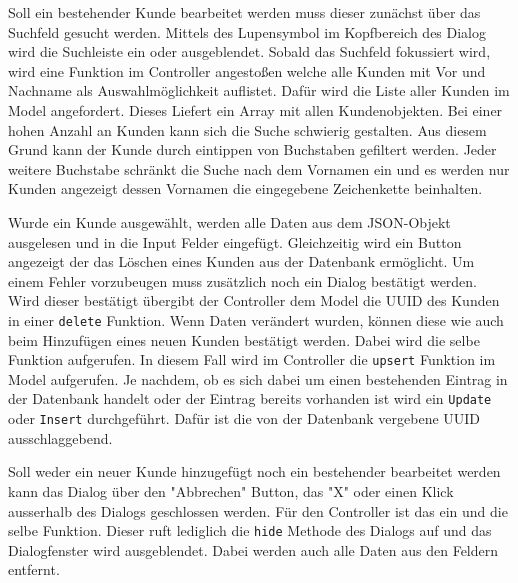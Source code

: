 Soll ein bestehender Kunde bearbeitet werden muss dieser zunächst über das Suchfeld gesucht werden. Mittels des Lupensymbol im Kopfbereich des Dialog wird die Suchleiste ein oder ausgeblendet. Sobald das Suchfeld fokussiert wird, wird eine Funktion im Controller angestoßen welche alle Kunden mit Vor und Nachname als Auswahlmöglichkeit auflistet. Dafür wird die Liste aller Kunden im Model angefordert. Dieses Liefert ein Array mit allen Kundenobjekten. Bei einer hohen Anzahl an Kunden kann sich die Suche schwierig gestalten. Aus diesem Grund kann der Kunde durch eintippen von Buchstaben gefiltert werden. Jeder weitere Buchstabe schränkt die Suche nach dem Vornamen ein und es werden nur Kunden angezeigt dessen Vornamen die eingegebene Zeichenkette beinhalten. 

Wurde ein Kunde ausgewählt, werden alle Daten aus dem JSON-Objekt ausgelesen und in die Input Felder eingefügt. Gleichzeitig wird ein Button angezeigt der das Löschen eines Kunden aus der Datenbank ermöglicht. Um einem Fehler vorzubeugen muss zusätzlich noch ein Dialog bestätigt werden. Wird dieser bestätigt übergibt der Controller dem Model die UUID des Kunden in einer \texttt{delete} Funktion. 
Wenn Daten verändert wurden, können diese wie auch beim Hinzufügen eines neuen Kunden bestätigt werden. Dabei wird die selbe Funktion aufgerufen. In diesem Fall wird im Controller die \texttt{upsert} Funktion im Model aufgerufen. Je nachdem, ob es sich dabei um einen bestehenden Eintrag in der Datenbank handelt oder der Eintrag bereits vorhanden ist wird ein \texttt{Update} oder \texttt{Insert} durchgeführt. Dafür ist die von der Datenbank vergebene UUID ausschlaggebend.

Soll weder ein neuer Kunde hinzugefügt noch ein bestehender bearbeitet werden kann das Dialog über den "Abbrechen" Button, das "X" oder einen Klick ausserhalb des Dialogs geschlossen werden. Für den Controller ist das ein und die selbe Funktion. Dieser ruft lediglich die \texttt{hide} Methode des Dialogs auf und das Dialogfenster wird ausgeblendet. Dabei werden auch alle Daten aus den Feldern entfernt.

